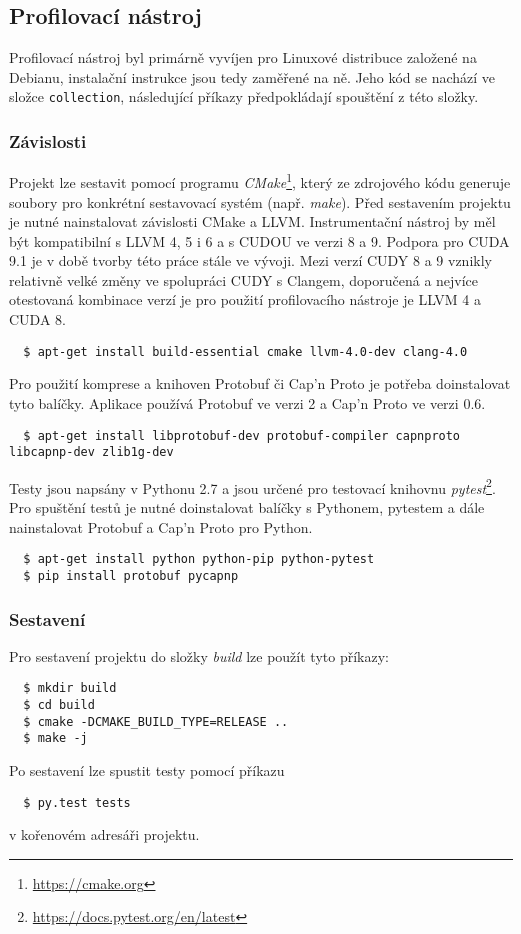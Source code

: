 \subsection{Profilovací nástroj}
Profilovací nástroj byl primárně vyvíjen pro Linuxové distribuce založené na Debianu, instalační instrukce jsou tedy zaměřené na ně. Jeho kód se nachází ve složce \texttt{collection}, následující příkazy předpokládají spouštění z této složky. 

\subsubsection{Závislosti}
Projekt lze sestavit pomocí programu \emph{CMake}\footnote{\url{https://cmake.org}}, který ze zdrojového kódu generuje soubory pro konkrétní sestavovací systém (např. \emph{make}). Před sestavením projektu je nutné nainstalovat závislosti CMake a LLVM. Instrumentační nástroj by měl být kompatibilní s LLVM 4, 5 i 6 a s CUDOU ve verzi 8 a 9. Podpora pro CUDA 9.1 je v době tvorby této práce stále ve vývoji.
Mezi verzí CUDY 8 a 9 vznikly relativně velké změny ve spolupráci CUDY s Clangem, doporučená a nejvíce otestovaná kombinace verzí je pro použití profilovacího nástroje je LLVM 4 a CUDA 8.
\begin{verbatim}
  $ apt-get install build-essential cmake llvm-4.0-dev clang-4.0
\end{verbatim}
Pro použití komprese a knihoven Protobuf či Cap'n Proto je potřeba doinstalovat tyto balíčky. Aplikace používá Protobuf ve verzi 2 a Cap'n Proto ve verzi 0.6.
\begin{verbatim}
  $ apt-get install libprotobuf-dev protobuf-compiler capnproto libcapnp-dev zlib1g-dev
\end{verbatim}
Testy jsou napsány v Pythonu 2.7 a jsou určené pro testovací knihovnu \emph{pytest}\footnote{\url{https://docs.pytest.org/en/latest}}. Pro spuštění testů je nutné doinstalovat balíčky s Pythonem, pytestem a dále nainstalovat Protobuf a Cap'n Proto pro Python.
\begin{verbatim}
  $ apt-get install python python-pip python-pytest
  $ pip install protobuf pycapnp
\end{verbatim}

\subsubsection{Sestavení}
Pro sestavení projektu do složky \emph{build} lze použít tyto příkazy:

\begin{verbatim}
  $ mkdir build
  $ cd build
  $ cmake -DCMAKE_BUILD_TYPE=RELEASE ..
  $ make -j
\end{verbatim}
Po sestavení lze spustit testy pomocí příkazu
\begin{verbatim}
  $ py.test tests
\end{verbatim}
v kořenovém adresáři projektu.

